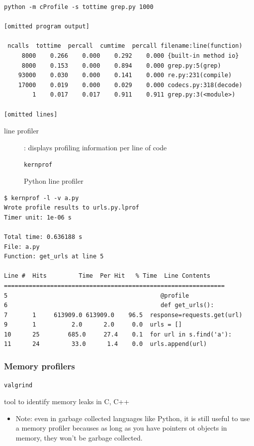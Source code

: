 \documentclass[letterpaper,12pt]{article}
\newcommand*{\lstitem}[1]{
  \setbox0\hbox{\lstinline{#1}}
  \item[\usebox0]
}
\begin{document}
\begin{lstlisting}
python -m cProfile -s tottime grep.py 1000

[omitted program output]

 ncalls  tottime  percall  cumtime  percall filename:line(function)
     8000    0.266    0.000    0.292    0.000 {built-in method io}
     8000    0.153    0.000    0.894    0.000 grep.py:5(grep)
    93000    0.030    0.000    0.141    0.000 re.py:231(compile)
    17000    0.019    0.000    0.029    0.000 codecs.py:318(decode)
        1    0.017    0.017    0.911    0.911 grep.py:3(<module>)

[omitted lines]
\end{lstlisting}

\begin{description}
 \item[line profiler]: displays profiling information per line of code
       \lstitem{kernprof} Python line profiler
\end{description}

\begin{lstlisting}
$ kernprof -l -v a.py
Wrote profile results to urls.py.lprof
Timer unit: 1e-06 s

Total time: 0.636188 s
File: a.py
Function: get_urls at line 5

Line #  Hits         Time  Per Hit   % Time  Line Contents
==============================================================
5                                           @profile
6                                           def get_urls():
7       1     613909.0 613909.0    96.5  response=requests.get(url)
9       1          2.0      2.0     0.0  urls = []
10      25        685.0     27.4    0.1  for url in s.find('a'):
11      24         33.0      1.4    0.0  urls.append(url)
\end{lstlisting}

\subsubsection{Memory profilers}
\begin{description}
 \lstitem{valgrind} tool to identify memory leaks in C, C++
\end{description}

\begin{itemize}
 \item Note: even in garbage collected languages like Python, it is still useful to use a memory profiler becauses as long as you have pointers ot objects in memory, they won't be garbage collected.
\end{itemize}
\end{document}
